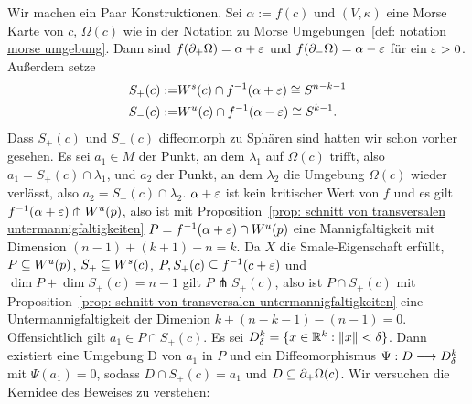 \begin{bigproof}
    Wir machen ein Paar Konstruktionen. Sei $\alpha := f(c)$ und $(V, \kappa)$ eine Morse Karte von
    $c$, $\Omega(c)$ wie in der Notation zu Morse Umgebungen~\ref{def: notation morse umgebung}. 
    Dann sind $f({ \partial }_+ \Omega) = \alpha + \varepsilon$ und $f({ \partial }_- \Omega) = \alpha - \varepsilon$ für ein 
    $\varepsilon > 0$. Außerdem setze
    \begin{align*}
        S_+ (c) := & { W^s } (c) \cap f^{-1}(\alpha + \varepsilon) \cong S^{n - k - 1} \\
        S_- (c) := & { W^u } (c) \cap f^{-1}(\alpha - \varepsilon) \cong S^{k - 1} .
    \end{align*}
    Dass $S_+ (c)$ und $S_- (c)$ diffeomorph zu Sphären sind hatten wir schon vorher gesehen.
    Es sei $a_1 \in M$ der Punkt, an dem $\lambda_1$ auf $\Omega(c)$ trifft, also 
    $a_1 = S_+ (c) \cap \lambda_1$, und $a_2$ der Punkt, an dem $\lambda_2$ die Umgebung $\Omega (c)$ 
    wieder verlässt, also $a_2 = S_- (c) \cap \lambda_2$. $\alpha + \varepsilon$ ist kein kritischer Wert 
    von $f$ und es gilt $f^{-1}(\alpha + \varepsilon) \pitchfork { W^u } (p)$, also ist mit 
    Proposition~\ref{prop: schnitt von transversalen untermannigfaltigkeiten} 
    $P = f^{-1}(\alpha + \varepsilon) \cap { W^u } (p)$ eine Mannigfaltigkeit mit Dimension 
    $(n - 1) + (k + 1) - n = k$. Da $X$ die Smale-Eigenschaft erfüllt, $P \subseteq { W^u } (p)$,
    $S_+ \subseteq { W^s }(c)$, $P, S_+(c) \subseteq f^{-1}(c + \varepsilon)$ und 
    $\dim P + \dim S_+(c) = n - 1$ gilt $P \pitchfork S_+ (c)$, also ist $P \cap S_+ (c)$
    mit Proposition~\ref{prop: schnitt von transversalen untermannigfaltigkeiten} eine 
    Untermannigfaltigkeit der Dimenion $k + (n - k - 1) - (n - 1) = 0$. Offensichtlich gilt 
    $a_1 \in P \cap S_+ (c)$. Es sei $D^k_{\delta} = \{ x \in { \mathbb R }^k : \| x \| < \delta \}$. Dann 
    existiert eine Umgebung D von $a_1$ in $P$ und ein Diffeomorphismus 
    $\Psi : D \longrightarrow D^k_{\delta}$ mit $\Psi(a_1) = 0$, sodass $D \cap S_+ (c) = a_1$ 
    und $D \subseteq { \partial }_+ \Omega (c)$. Wir versuchen die Kernidee des Beweises zu verstehen:


\end{bigproof}
